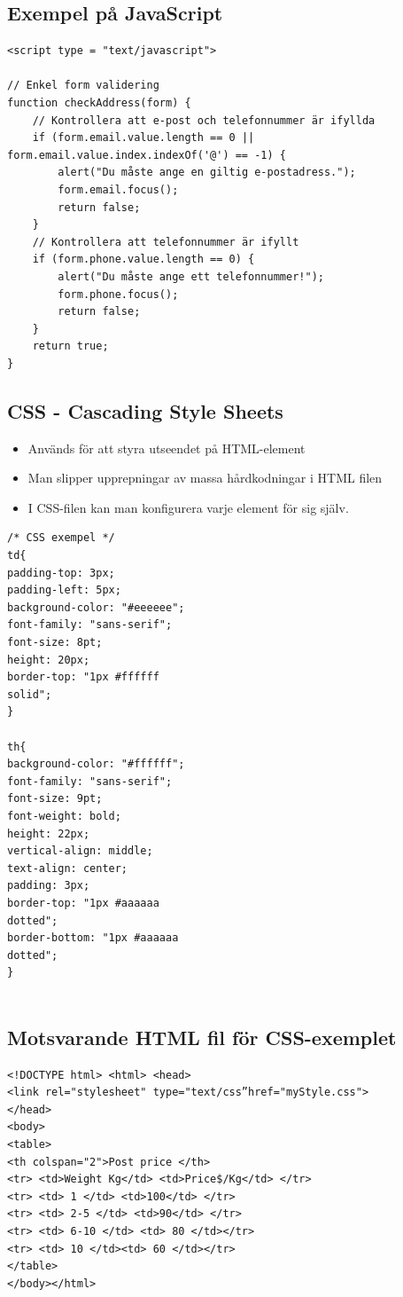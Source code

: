 \documentclass[12pt,a4paper]{article}
\begin{document}
\subsection{Exempel på JavaScript}
\begin{verbatim}
<script type = "text/javascript">

// Enkel form validering 
function checkAddress(form) {
    // Kontrollera att e-post och telefonnummer är ifyllda
    if (form.email.value.length == 0 || form.email.value.index.indexOf('@') == -1) {
        alert("Du måste ange en giltig e-postadress.");
        form.email.focus();
        return false;
    }
    // Kontrollera att telefonnummer är ifyllt
    if (form.phone.value.length == 0) {
        alert("Du måste ange ett telefonnummer!");
        form.phone.focus();
        return false;
    }
    return true;
}
\end{verbatim}

\subsection{CSS - \textbf{C}ascading \textbf{S}tyle \textbf{S}heets}
\begin{itemize}
    \item Används för att styra utseendet på HTML-element
    \item Man slipper upprepningar av massa hårdkodningar i HTML filen
    \item I CSS-filen kan man konfigurera varje element för sig själv.
\end{itemize}

\begin{verbatim}
/* CSS exempel */
td{
padding-top: 3px; 
padding-left: 5px; 
background-color: "#eeeeee"; 
font-family: "sans-serif"; 
font-size: 8pt;
height: 20px;
border-top: "1px #ffffff
solid"; 
} 

th{ 
background-color: "#ffffff"; 
font-family: "sans-serif"; 
font-size: 9pt;
font-weight: bold; 
height: 22px; 
vertical-align: middle; 
text-align: center; 
padding: 3px; 
border-top: "1px #aaaaaa
dotted"; 
border-bottom: "1px #aaaaaa
dotted"; 
}
    
\end{verbatim}

\subsection{Motsvarande HTML fil för CSS-exemplet}
\begin{verbatim}
<!DOCTYPE html> <html> <head>
<link rel="stylesheet" type="text/css”href="myStyle.css">
</head>
<body>
<table>
<th colspan="2">Post price </th>
<tr> <td>Weight Kg</td> <td>Price$/Kg</td> </tr> 
<tr> <td> 1 </td> <td>100</td> </tr> 
<tr> <td> 2-5 </td> <td>90</td> </tr> 
<tr> <td> 6-10 </td> <td> 80 </td></tr> 
<tr> <td> 10 </td><td> 60 </td></tr>
</table> 
</body></html>
\end{verbatim}
\end{document}
